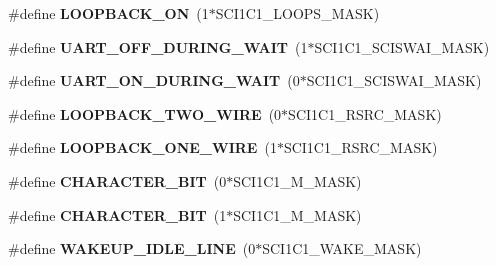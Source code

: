 \begin{DoxyCompactItemize}
\item 
\hypertarget{group__hal__hcs08_ga7e1861e44c67148b15f190a3db2dae68}{\#define {\bfseries L\-O\-O\-P\-B\-A\-C\-K\-\_\-\-O\-N}~(1$\ast$S\-C\-I1\-C1\-\_\-\-L\-O\-O\-P\-S\-\_\-\-M\-A\-S\-K)}\label{group__hal__hcs08_ga7e1861e44c67148b15f190a3db2dae68}

\item 
\hypertarget{group__hal__hcs08_gae9834631c2f2af773cfd0922b34e2585}{\#define {\bfseries U\-A\-R\-T\-\_\-\-O\-F\-F\-\_\-\-D\-U\-R\-I\-N\-G\-\_\-\-W\-A\-I\-T}~(1$\ast$S\-C\-I1\-C1\-\_\-\-S\-C\-I\-S\-W\-A\-I\-\_\-\-M\-A\-S\-K)}\label{group__hal__hcs08_gae9834631c2f2af773cfd0922b34e2585}

\item 
\hypertarget{group__hal__hcs08_ga1744d6efe5c7cd1a39598fef0e0af8d4}{\#define {\bfseries U\-A\-R\-T\-\_\-\-O\-N\-\_\-\-D\-U\-R\-I\-N\-G\-\_\-\-W\-A\-I\-T}~(0$\ast$S\-C\-I1\-C1\-\_\-\-S\-C\-I\-S\-W\-A\-I\-\_\-\-M\-A\-S\-K)}\label{group__hal__hcs08_ga1744d6efe5c7cd1a39598fef0e0af8d4}

\item 
\hypertarget{group__hal__hcs08_ga25d27a14c5440938136dae2800615545}{\#define {\bfseries L\-O\-O\-P\-B\-A\-C\-K\-\_\-\-T\-W\-O\-\_\-\-W\-I\-R\-E}~(0$\ast$S\-C\-I1\-C1\-\_\-\-R\-S\-R\-C\-\_\-\-M\-A\-S\-K)}\label{group__hal__hcs08_ga25d27a14c5440938136dae2800615545}

\item 
\hypertarget{group__hal__hcs08_ga0f35b829f9d0c8f8c97f602db5d56647}{\#define {\bfseries L\-O\-O\-P\-B\-A\-C\-K\-\_\-\-O\-N\-E\-\_\-\-W\-I\-R\-E}~(1$\ast$S\-C\-I1\-C1\-\_\-\-R\-S\-R\-C\-\_\-\-M\-A\-S\-K)}\label{group__hal__hcs08_ga0f35b829f9d0c8f8c97f602db5d56647}

\item 
\hypertarget{group__hal__hcs08_gad77aa548b2536bccf1b324e771914290}{\#define {\bfseries C\-H\-A\-R\-A\-C\-T\-E\-R\-\_\-B\-I\-T}~(0$\ast$S\-C\-I1\-C1\-\_\-\-M\-\_\-\-M\-A\-S\-K)}\label{group__hal__hcs08_gad77aa548b2536bccf1b324e771914290}

\item 
\hypertarget{group__hal__hcs08_ga962590525d78b87e2ea37f9e070c1ec6}{\#define {\bfseries C\-H\-A\-R\-A\-C\-T\-E\-R\-\_\-B\-I\-T}~(1$\ast$S\-C\-I1\-C1\-\_\-\-M\-\_\-\-M\-A\-S\-K)}\label{group__hal__hcs08_ga962590525d78b87e2ea37f9e070c1ec6}

\item 
\hypertarget{group__hal__hcs08_ga32fbf7b38d85f44b730ccc6da30b5212}{\#define {\bfseries W\-A\-K\-E\-U\-P\-\_\-\-I\-D\-L\-E\-\_\-\-L\-I\-N\-E}~(0$\ast$S\-C\-I1\-C1\-\_\-\-W\-A\-K\-E\-\_\-\-M\-A\-S\-K)}\label{group__hal__hcs08_ga32fbf7b38d85f44b730ccc6da30b5212}


\end{DoxyCompactItemize}
